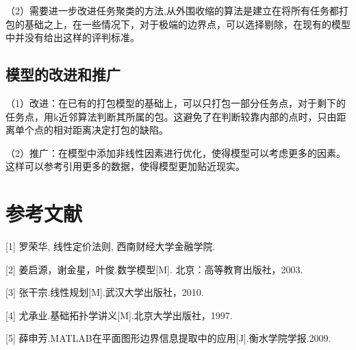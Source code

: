 \documentclass{ctexart}
\begin{document}
（2）需要进一步改进任务聚类的方法,从外围收缩的算法是建立在将所有任务都打包的基础之上，在一些情况下，对于极端的边界点，可以选择剔除，在现有的模型中并没有给出这样的评判标准。

 \subsection{模型的改进和推广}
（1）改进：在已有的打包模型的基础上，可以只打包一部分任务点，对于剩下的任务点，用k近邻算法判断其所属的包。这避免了在判断较靠内部的点时，只由距离单个点的相对距离决定打包的缺陷。

（2）推广：在模型中添加非线性因素进行优化，使得模型可以考虑更多的因素。这样可以参考引用更多的数据，使得模型更加贴近现实。

\section*{参考文献}
[1] 罗荣华, 线性定价法则, 西南财经大学金融学院.

[2] 姜启源，谢金星，叶俊.数学模型[M]. 北京：高等教育出版社，2003.

[3] 张干宗.线性规划[M].武汉大学出版社，2010.

[4] 尤承业.基础拓扑学讲义[M].北京大学出版社，1997.

[5] 薛申芳.MATLAB在平面图形边界信息提取中的应用[J].衡水学院学报.2009.
\end{document}

